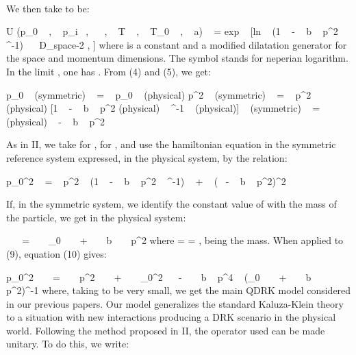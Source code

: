 \documentclass[a4paper,12pt,dvips]{article}
\begin{document}
~

We then take \coordHE{} to be:

\equation
U (p_0 ~ , ~ p_i ~,~ \sigma  ~ , ~ T ~ , ~ T_0 ~ , ~ a) ~ = exp ~ [ln ~ (1 ~ - ~ b ~ p^2 ~ \sigma ^{-1}) ~ ~D_{space-2 , \sigma}]
\endequation
\noindent
where \coordHE{} is a constant and \coordHE{} a modified dilatation generator for the space and \myHighlight{$\sigma$}\coordHE{} momentum dimensions. The symbol \coordHE{} stands for neperian logarithm. In the limit \coordHE{} , one has \coordHE{} . From (4) and (5), we get:

\equation
p_0 ~ (symmetric) ~ = ~ p_0 ~ (physical)
\endequation
\equation
p^2 ~ (symmetric) ~ = ~ p^2 ~ (physical) [1 ~ - ~ b ~ p^2 (physical) ~ \sigma ^{-1} ~ (physical)]
\endequation
\equation
\sigma ~ (symmetric) ~ = ~ \sigma ~ (physical) ~ - ~ b ~ p^2
\endequation


As in II, we take \coordHE{} for \coordHE{}, \myHighlight{$\sigma$}\coordHE{} for \coordHE{}, and use the hamiltonian equation in the symmetric reference system expressed, in the physical system, by the relation:

\equation
p_{0}^2 ~ = ~ p^2 ~ (1 ~ - ~ b ~ p^2 ~ \sigma ^{-1}) ~ + ~ (\sigma ~ - ~ b ~ p^2)^2 
\endequation
\noindent

If, in the symmetric system, we identify the constant value of \myHighlight{$\sigma $}\coordHE{} with the mass of the particle, we get in the physical system:

\equation
\sigma ~ ~ = ~ ~ \sigma _0 ~ ~ + ~ ~ b ~ ~ p^2
\endequation
\noindent
where \coordHE{} = = \coordHE{}  \coordHE{} , \coordHE{} being the mass. When applied to (9), equation (10) gives:

\equation
p_{0}^2 ~ ~ = ~ ~ p^2 ~ ~ + ~ ~ \sigma _0^2~ ~ - ~ ~ b ~ p^4 ~ (\sigma _0 ~ ~ + ~ ~ b ~ ~ p^2)^{-1}
\endequation
\noindent
where, taking \coordHE{} to be very small, we get the main QDRK model considered in our previous papers. Our model generalizes the standard Kaluza-Klein theory to a situation with new interactions producing a DRK scenario in the physical world. Following the method proposed in II, the \coordHE{} operator used can be made unitary. To do this, we write:
\end{document}
